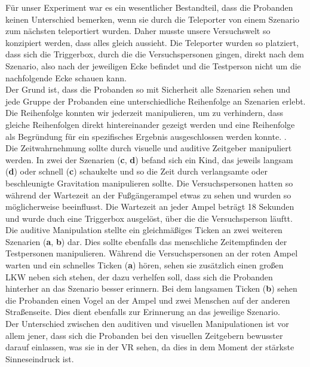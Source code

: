 \documentclass{Paper}
\begin{document}
Für unser Experiment war es ein wesentlicher Bestandteil, dass die Probanden keinen Unterschied bemerken, wenn sie durch die Teleporter von einem Szenario zum nächsten teleportiert wurden. Daher musste unsere Versuchswelt so konzipiert werden, dass alles gleich aussieht. Die Teleporter wurden so platziert, dass sich die Triggerbox, durch die die Versuchspersonen gingen, direkt nach dem Szenario, also nach der jeweiligen Ecke befindet und die Testperson nicht um die nachfolgende Ecke schauen kann.\\
Der Grund ist, dass die Probanden so mit Sicherheit alle Szenarien sehen und jede Gruppe der Probanden eine unterschiedliche Reihenfolge an Szenarien erlebt. Die Reihenfolge konnten wir jederzeit manipulieren, um zu verhindern, dass gleiche Reihenfolgen direkt hintereinander gezeigt werden und eine Reihenfolge als Begründung für ein spezifisches Ergebnis ausgeschlossen werden konnte. .\\
Die Zeitwahrnehmung sollte durch visuelle und auditive Zeitgeber manipuliert werden. In zwei der Szenarien (\textbf{c}, \textbf{d}) befand sich ein Kind, das jeweils langsam  (\textbf{d}) oder schnell (\textbf{c}) schaukelte und so die Zeit durch verlangsamte oder beschleunigte Gravitation manipulieren sollte. Die Versuchspersonen hatten so während der Wartezeit an der Fußgängerampel etwas zu sehen und wurden so möglicherweise beeinflusst. Die Wartezeit an jeder Ampel beträgt 18 Sekunden und wurde duch eine Triggerbox ausgelöst, über die die Versuchsperson läuftt. \\
Die auditive Manipulation stellte ein gleichmäßiges Ticken an zwei weiteren Szenarien (\textbf{a}, \textbf{b}) dar. Dies sollte ebenfalls das menschliche Zeitempfinden der Testpersonen manipulieren. Während die Versuchspersonen an der roten Ampel warten und ein schnelles Ticken (\textbf{a}) hören, sehen sie zusätzlich einen großen LKW neben sich stehen, der dazu verhelfen soll, dass sich die Probanden hinterher an das Szenario besser erinnern.
Bei dem langsamen Ticken (\textbf{b}) sehen die Probanden einen Vogel an der Ampel und zwei Menschen auf der anderen Straßenseite. Dies dient ebenfalls zur Erinnerung an das jeweilige Szenario.  \\
Der Unterschied zwischen den auditiven und visuellen Manipulationen ist vor allem jener, dass sich die Probanden bei den visuellen Zeitgebern bewusster darauf einlassen, was sie in der VR sehen, da dies in dem Moment der stärkste Sinneseindruck ist.\\
\end{document}

